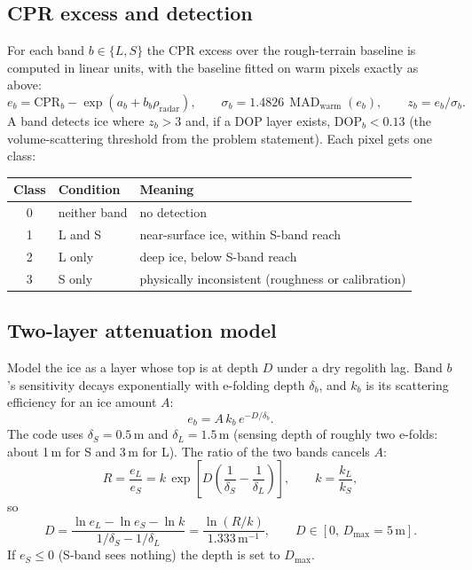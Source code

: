 \documentclass[11pt,a4paper]{article}
\DeclareMathOperator{\MAD}{MAD}
\begin{document}
\subsection{CPR excess and detection}
For each band $b\in\{L,S\}$ the CPR excess over the rough-terrain baseline is computed in
linear units, with the baseline fitted on warm pixels exactly as above:
\begin{equation}
  e_b = \mathrm{CPR}_b - \exp(a_b+b_b\rho_{\mathrm{radar}}),\qquad
  \sigma_b = 1.4826\,\MAD_{\mathrm{warm}}(e_b),\qquad z_b = e_b/\sigma_b .
\end{equation}
A band detects ice where $z_b>3$ and, if a DOP layer exists, $\mathrm{DOP}_b<0.13$ (the
volume-scattering threshold from the problem statement). Each pixel gets one class:

\begin{center}
\begin{tabular}{@{}cll@{}}
\toprule
Class & Condition & Meaning \\
\midrule
0 & neither band & no detection \\
1 & L and S & near-surface ice, within S-band reach \\
2 & L only & deep ice, below S-band reach \\
3 & S only & physically inconsistent (roughness or calibration) \\
\bottomrule
\end{tabular}
\end{center}

\subsection{Two-layer attenuation model}
Model the ice as a layer whose top is at depth $D$ under a dry regolith lag. Band $b$'s
sensitivity decays exponentially with e-folding depth $\delta_b$, and $k_b$ is its scattering
efficiency for an ice amount $A$:
\begin{equation}
  e_b = A\,k_b\,e^{-D/\delta_b}.
\end{equation}
The code uses $\delta_S=0.5$\,m and $\delta_L=1.5$\,m (sensing depth of roughly two e-folds:
about 1\,m for S and 3\,m for L). The ratio of the two bands cancels $A$:
\begin{equation}
  R=\frac{e_L}{e_S}=k\,\exp\!\left[D\left(\frac1{\delta_S}-\frac1{\delta_L}\right)\right],
  \qquad k=\frac{k_L}{k_S},
\end{equation}
so
\begin{equation}
  D = \frac{\ln e_L-\ln e_S-\ln k}{1/\delta_S-1/\delta_L}
    = \frac{\ln(R/k)}{1.333\,\mathrm{m}^{-1}},
  \qquad D\in[0,\,D_{\max}=5\,\mathrm{m}].
\end{equation}
If $e_S\le0$ (S-band sees nothing) the depth is set to $D_{\max}$.
\end{document}
